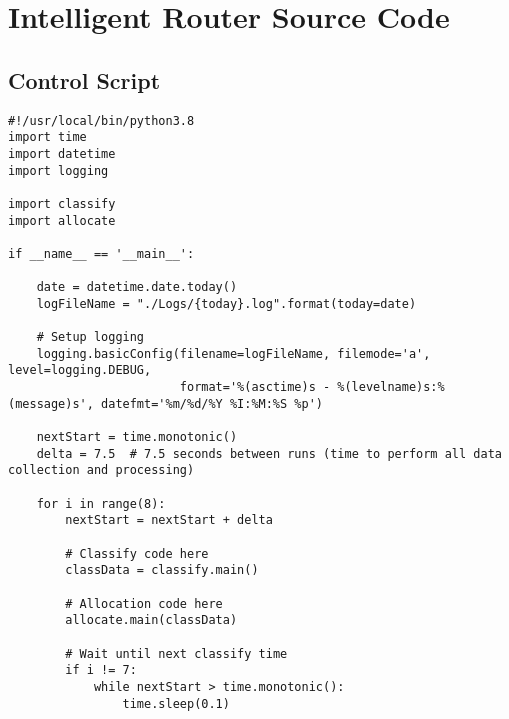 \chapter{Intelligent Router Source Code}
\label{appendixb}
\section{Control Script}
\begin{verbatim}
#!/usr/local/bin/python3.8
import time
import datetime
import logging

import classify
import allocate

if __name__ == '__main__':

    date = datetime.date.today()
    logFileName = "./Logs/{today}.log".format(today=date)

    # Setup logging
    logging.basicConfig(filename=logFileName, filemode='a', level=logging.DEBUG,
                        format='%(asctime)s - %(levelname)s:%(message)s', datefmt='%m/%d/%Y %I:%M:%S %p')

    nextStart = time.monotonic()
    delta = 7.5  # 7.5 seconds between runs (time to perform all data collection and processing)

    for i in range(8):
        nextStart = nextStart + delta

        # Classify code here
        classData = classify.main()

        # Allocation code here
        allocate.main(classData)

        # Wait until next classify time
        if i != 7:
            while nextStart > time.monotonic():
                time.sleep(0.1)
\end{verbatim}


